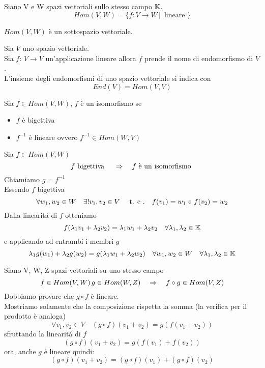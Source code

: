 \begin{defn} [Omomorfismi] \bianco
Siano V e W spazi vettoriali sullo stesso campo $\mathbb{K}$.
$$Hom(V,W)=\{ f: V \to W \, | \,\text{  lineare } \}$$ 
\end{defn}
\begin{prop} $Hom(V,W)$ è un sottospazio vettoriale.
\end{prop}
\spazio

\begin{defn}[Endomorfismi] \bianco
Sia $V$ uno spazio vettoriale.\\
Sia  $f:\, V \to V $ un'applicazione lineare allora $f$ prende il nome di endomorfismo di $V$.\\
L'insieme degli endomorfismi di uno spazio vettoriale si indica con
$$ End(V)=Hom(V,V) $$
\end{defn}
\spazio

\begin{defn}[Isomorfismi]\bianco
Sia $f\in Hom(V,W)$, $f$ \`e un isomorfismo se 
\begin{itemize}

\item $f$ \`e bigettiva
\item $f^{-1}$ \`e lineare ovvero $ f^{-1} \in Hom(W,V)$

\end{itemize}
\end{defn}
\begin{thm} Sia $f \in Hom(V,W)$
$$ f \text{ bigettiva } \quad \Rightarrow \quad f \text{ \`e un isomorfismo }$$
\proof Chiamiamo $g=f^{-1}$\\
Essendo $f$ bigettiva
$$\forall w_1, w_2 \in W \quad  \exists ! v_1, v_2 \in V \quad \text{ t. c .} \quad  f(v_1)=w_1 \text { e }  f(v_2)=w_2$$
Dalla linearit\'a di $f$ otteniamo 
$$ f ( \lambda_1 v_1 + \lambda_2 v_2 ) = \lambda_1 w_1 + \lambda_2 v_2  \quad \forall \lambda_1, \lambda_2 \in \mathbb{K} $$
e applicando ad entrambi i membri $g$
$$ \lambda_1 g(w_1)  + \lambda_2 g(w_2)= g( \lambda_1 w_1 + \lambda_2 w_2) \quad \forall w_1, w_2 \in W \quad \forall \lambda_1, \lambda_2 \in \mathbb{K}$$
\endproof
\end{thm}
\newpage

\begin{thm}[Composizione] Siano V, W, Z spazi vettoriali  su uno stesso campo 
$$ f \in Hom(V,W) \, g \in Hom (W,Z) \quad \Rightarrow \quad f\circ g \in Hom (V,Z)$$
\proof Dobbiamo provare che $g\circ f $ \`e lineare.\\
Mostriamo solamente che la composizione rispetta la somma (la verifica per il prodotto \`e analoga)
$$ \forall v_1, v_2 \in V \quad (g \circ f)(v_1 + v_2)=g(f(v_1+v_2))$$
sfruttando la linearit\'a di $f$ 
$$ (g \circ f)(v_1 + v_2)= g(f(v_1)+f(v_2))$$
ora, anche $g$ \`e lineare quindi:
$$ (g \circ f)(v_1 + v_2)= (g\circ f)(v_1) + (g\circ f)(v_2)$$
\endproof
\end{thm}


